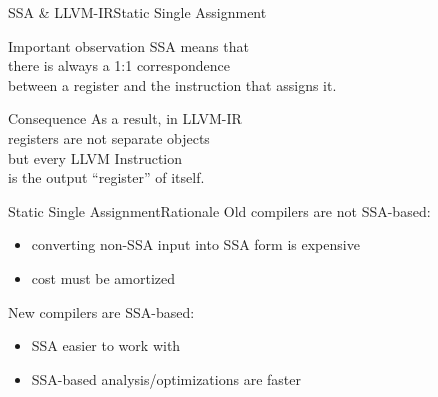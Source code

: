 \begin{frame}{SSA \& LLVM-IR}{Static Single Assignment}
\large
\begin{block}{\centering Important observation}
\centering
SSA means that\\
\alert{there is always a 1:1 correspondence}\\
\alert{between a register and the instruction that assigns it}.
\end{block}
\bigskip
\begin{block}{\centering Consequence}
\centering
As a result, in LLVM-IR\\
\alert{registers are not separate objects}\\
but \alert{every LLVM Instruction\\is the output ``register'' of itself}.
\end{block}
\end{frame}


\begin{frame}{Static Single Assignment}{Rationale}
Old compilers are not SSA-based:

\begin{itemize}
\item converting non-SSA input into SSA form is expensive
\item cost must be amortized
\end{itemize}

\vfill
New compilers are SSA-based:

\begin{itemize}
\item SSA easier to work with
\item SSA-based analysis/optimizations are faster
\end{itemize}

%
\end{frame}




